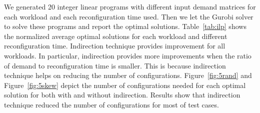 We generated 20 integer linear programs with different input demand
matrices for each workload and each reconfiguration time used. Then we
let the Gurobi solver to solve these programs and report the optimal
solutions. Table~\ref{tab:ilp} shows the normalized average optimal
solutions for each workload and different reconfiguration time.
Indirection technique provides improvement for all workloads. In
particular, indirection provides more improvements when the ratio of
demand to reconfiguration time is smaller. This is because indirection
technique helps on reducing the number of configurations.
Figure~\ref{fig:5rand} and Figure~\ref{fig:5skew} depict the number of
configurations needed for each optimal solution for both with and
without indirection. Results show that indirection technique reduced the
number of configurations for most of test cases.